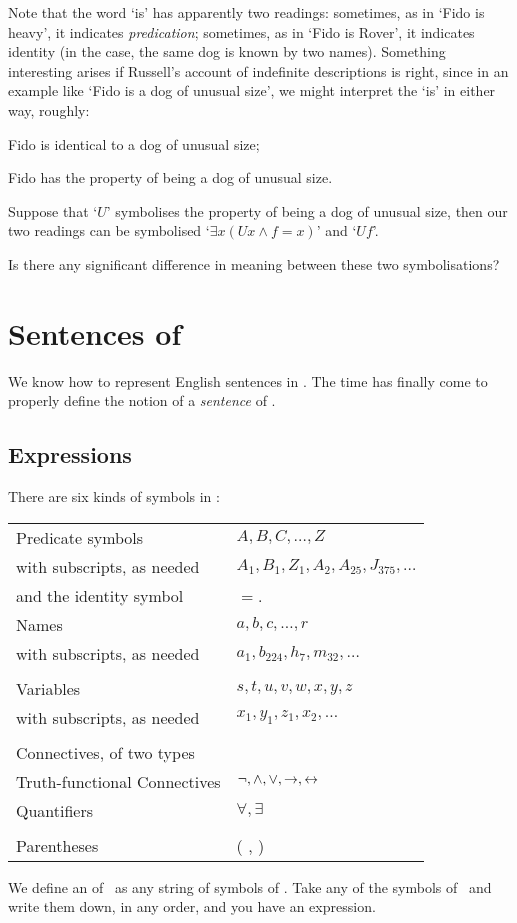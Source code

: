 Note that the word `is' has apparently two readings: sometimes, as in `Fido is heavy', it indicates \emph{predication}; sometimes, as in `Fido is Rover', it indicates identity (in the case, the same dog is known by two names). Something interesting arises if Russell's account of indefinite descriptions is right, since in an example like `Fido is a dog of unusual size', we might interpret the `is' in either way, roughly:
\begin{earg}
 \item Fido is identical to a dog of unusual size;
 \item Fido has the property of being a dog of unusual size.
 \end{earg} Suppose that `$U$' symbolises the property of being a dog of unusual size, then our two readings can be symbolised `$\exists x (Ux \wedge f=x)$' and `$Uf$'. 

 Is there any significant difference in meaning between these two symbolisations?  






\chapter{Sentences of \textnormal{\FOL}}\label{s:FOLSentences}
We know how to represent English sentences in \FOL. The time has finally come to properly define the notion of a \emph{sentence} of \FOL.

\section{Expressions}
There are six kinds of symbols in \FOL:

\begin{center}
\begin{tabular}{l l} \toprule 
Predicate symbols & $A,B,C,…,Z$\\
with subscripts, as needed & $A_{1}, B_{1},Z_{1},A_{2},A_{25},J_{375},…$\\
and the identity symbol &  $=$.
\\
Names & $a,b,c,…, r$\\
with subscripts, as needed & $a_{1}, b_{224}, h_7, m_{32},…$\\
\\
Variables & $s, t, u, v, w, x,y,z$\\
with subscripts, as needed & $x_{1}, y_{1}, z_{1}, x_{2},…$\\
\\
Connectives, of two types & \\
Truth-functional Connectives & $\neg,\wedge,\vee,\rightarrow,\leftrightarrow$\\
Quantifiers & $\forall, \exists$\\
\\
Parentheses &( , )\\
\bottomrule \end{tabular}
\end{center}
We define an  of \FOL\ as any string of symbols of \FOL. Take any of the symbols of \FOL\ and write them down, in any order, and you have an expression.

